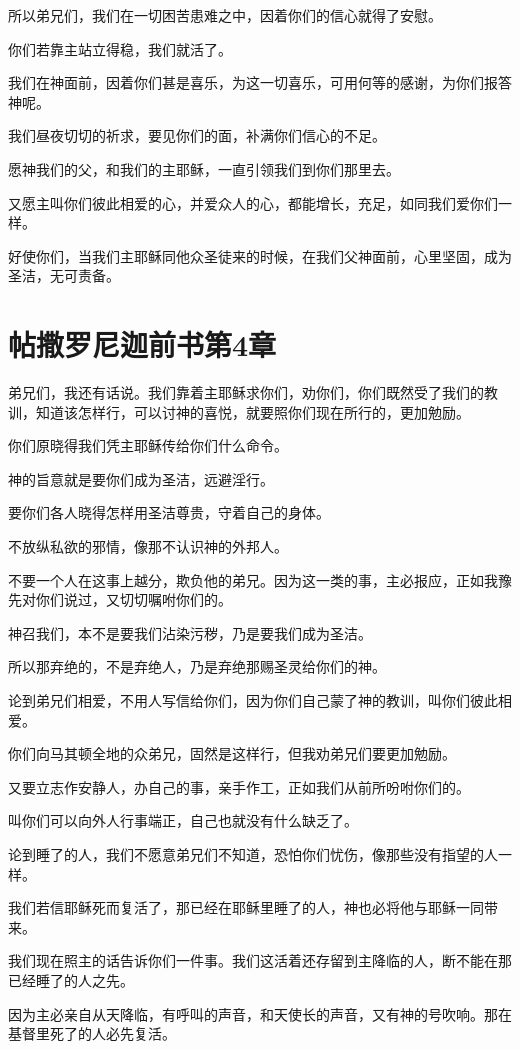 \documentclass[12pt,oneside]{book}
\begin{document}
所以弟兄们，我们在一切困苦患难之中，因着你们的信心就得了安慰。

你们若靠主站立得稳，我们就活了。

我们在神面前，因着你们甚是喜乐，为这一切喜乐，可用何等的感谢，为你们报答神呢。

我们昼夜切切的祈求，要见你们的面，补满你们信心的不足。

愿神我们的父，和我们的主耶稣，一直引领我们到你们那里去。

又愿主叫你们彼此相爱的心，并爱众人的心，都能增长，充足，如同我们爱你们一样。

好使你们，当我们主耶稣同他众圣徒来的时候，在我们父神面前，心里坚固，成为圣洁，无可责备。

\chapter{帖撒罗尼迦前书第4章}
弟兄们，我还有话说。我们靠着主耶稣求你们，劝你们，你们既然受了我们的教训，知道该怎样行，可以讨神的喜悦，就要照你们现在所行的，更加勉励。

你们原晓得我们凭主耶稣传给你们什么命令。

神的旨意就是要你们成为圣洁，远避淫行。

要你们各人晓得怎样用圣洁尊贵，守着自己的身体。

不放纵私欲的邪情，像那不认识神的外邦人。

不要一个人在这事上越分，欺负他的弟兄。因为这一类的事，主必报应，正如我豫先对你们说过，又切切嘱咐你们的。

神召我们，本不是要我们沾染污秽，乃是要我们成为圣洁。

所以那弃绝的，不是弃绝人，乃是弃绝那赐圣灵给你们的神。

论到弟兄们相爱，不用人写信给你们，因为你们自己蒙了神的教训，叫你们彼此相爱。

你们向马其顿全地的众弟兄，固然是这样行，但我劝弟兄们要更加勉励。

又要立志作安静人，办自己的事，亲手作工，正如我们从前所吩咐你们的。

叫你们可以向外人行事端正，自己也就没有什么缺乏了。

论到睡了的人，我们不愿意弟兄们不知道，恐怕你们忧伤，像那些没有指望的人一样。

我们若信耶稣死而复活了，那已经在耶稣里睡了的人，神也必将他与耶稣一同带来。

我们现在照主的话告诉你们一件事。我们这活着还存留到主降临的人，断不能在那已经睡了的人之先。

因为主必亲自从天降临，有呼叫的声音，和天使长的声音，又有神的号吹响。那在基督里死了的人必先复活。
\end{document}
